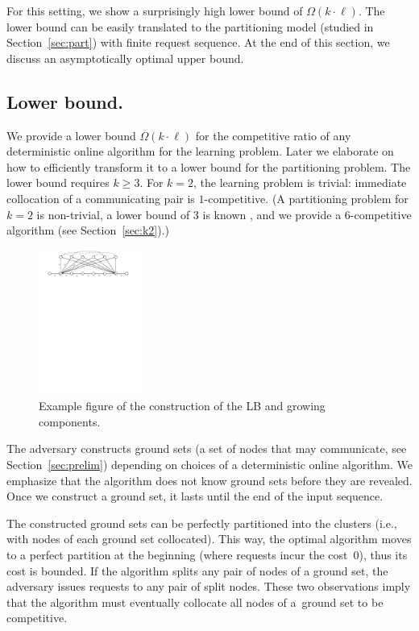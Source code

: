 \documentclass[manuscript,screen=true, review, anonymous]{acmart}
\begin{document}
For this setting, we show a surprisingly high lower bound of $\Omega(k \cdot \ell)$.
The lower bound can be easily translated to the partitioning model (studied in Section~\ref{sec:part}) with finite request sequence.
At the end of this section, we discuss an asymptotically optimal upper bound.


\subsection{Lower bound.}

\label{sec:lowerbound}


We provide a lower bound $\Omega(k\cdot \ell)$ for the competitive ratio of any deterministic online algorithm for the learning problem.
Later we elaborate on how to efficiently transform it to a lower bound for the partitioning problem.
The lower bound requires $k\geq 3$.
For $k=2$, the learning problem is trivial: immediate collocation of a communicating pair is $1$-competitive.
(A partitioning problem for $k=2$ is non-trivial, a lower bound of $3$ is known \cite{repartition-disc}, and we provide a $6$-competitive algorithm (see Section~\ref{sec:k2}).)




\begin{figure}[H]
	\centering
	\includegraphics[width=0.3\textwidth]{figs/substitute}
	\caption{Example figure of the construction of the LB and growing components.}
	\label{fig:nptree-construction}
\end{figure}


The adversary constructs ground sets (a set of nodes that may communicate, see Section~\ref{sec:prelim}) depending on choices of a deterministic online algorithm.
We emphasize that the algorithm does not know ground sets before they are revealed.
Once we construct a ground set, it lasts until the end of the input sequence.

The constructed ground sets can be perfectly partitioned into the clusters (i.e., with nodes of each ground set collocated).
This way, the optimal algorithm moves to a perfect partition at the beginning (where requests incur the cost~$0$), thus its cost is bounded.
If the algorithm splits any pair of nodes of a ground set, the adversary issues requests to any pair of split nodes.
These two observations imply that the algorithm must eventually collocate all nodes of a~ground set to be competitive.
\end{document}
